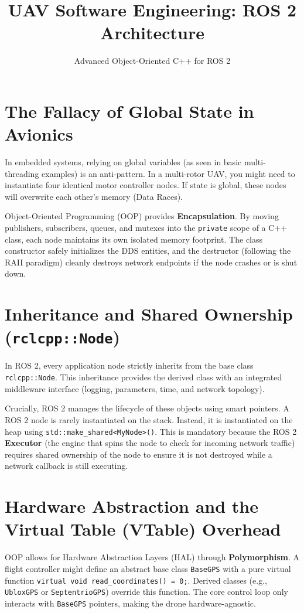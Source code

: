 \documentclass{article}
\title{UAV Software Engineering: ROS 2 Architecture}
\author{Advanced Object-Oriented C++ for ROS 2}
\date{}
\begin{document}
\maketitle

\section{The Fallacy of Global State in Avionics}
In embedded systems, relying on global variables (as seen in basic multi-threading examples) is an anti-pattern. In a multi-rotor UAV, you might need to instantiate four identical motor controller nodes. If state is global, these nodes will overwrite each other's memory (Data Races). 

Object-Oriented Programming (OOP) provides \textbf{Encapsulation}. By moving publishers, subscribers, queues, and mutexes into the \texttt{private} scope of a C++ class, each node maintains its own isolated memory footprint. The class constructor safely initializes the DDS entities, and the destructor (following the RAII paradigm) cleanly destroys network endpoints if the node crashes or is shut down.

\section{Inheritance and Shared Ownership (\texttt{rclcpp::Node})}
In ROS 2, every application node strictly inherits from the base class \texttt{rclcpp::Node}. This inheritance provides the derived class with an integrated middleware interface (logging, parameters, time, and network topology).

Crucially, ROS 2 manages the lifecycle of these objects using smart pointers. A ROS 2 node is rarely instantiated on the stack. Instead, it is instantiated on the heap using \texttt{std::make\_shared<MyNode>()}. This is mandatory because the ROS 2 \textbf{Executor} (the engine that spins the node to check for incoming network traffic) requires shared ownership of the node to ensure it is not destroyed while a network callback is still executing.

\section{Hardware Abstraction and the Virtual Table (VTable) Overhead}
OOP allows for Hardware Abstraction Layers (HAL) through \textbf{Polymorphism}. A flight controller might define an abstract base class \texttt{BaseGPS} with a pure virtual function \texttt{virtual void read\_coordinates() = 0;}. Derived classes (e.g., \texttt{UbloxGPS} or \texttt{SeptentrioGPS}) override this function. The core control loop only interacts with \texttt{BaseGPS} pointers, making the drone hardware-agnostic.
\end{document}
